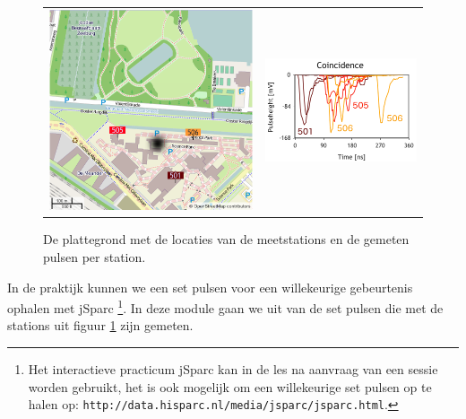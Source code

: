 \begin{figure}[h]
\noindent \begin{centering}
\begin{tabular}{cc}
\includegraphics[scale=0.33]{Figures/kaart} & \includegraphics[scale=0.65]{Figures/Coincidence}\tabularnewline
\end{tabular}
\par\end{centering}

\caption{\label{fig:coincidence}De plattegrond met de locaties van de meetstations
en de gemeten pulsen per station.}
\end{figure}


In de praktijk kunnen we een set pulsen voor een willekeurige gebeurtenis
ophalen met jSparc%
\footnote{Het interactieve practicum jSparc kan in de les na aanvraag van een
sessie worden gebruikt, het is ook mogelijk om een willekeurige set
pulsen op te halen op: \texttt{http://data.hisparc.nl/media/jsparc/jsparc.html}.%
}. In deze module gaan we uit van de set pulsen die met de stations
uit figuur \ref{fig:coincidence} zijn gemeten.

